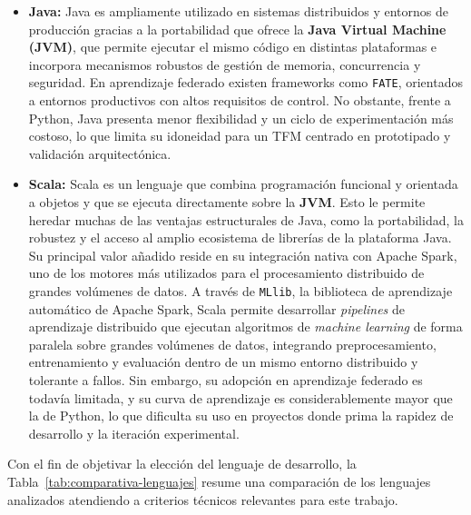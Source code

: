 \documentclass{report}
\begin{document}
\begin{itemize}
\item \textbf{Java:}  
Java es ampliamente utilizado en sistemas distribuidos y entornos de producción gracias a la portabilidad que ofrece la \textbf{Java Virtual Machine (JVM)}, que permite ejecutar el mismo código en distintas plataformas e incorpora mecanismos robustos de gestión de memoria, concurrencia y seguridad.  
En aprendizaje federado existen frameworks como \texttt{FATE}, orientados a entornos productivos con altos requisitos de control. No obstante, frente a Python, Java presenta menor flexibilidad y un ciclo de experimentación más costoso, lo que limita su idoneidad para un TFM centrado en prototipado y validación arquitectónica.


\item \textbf{Scala:}  
Scala es un lenguaje que combina programación funcional y orientada a objetos y que se ejecuta directamente sobre la \textbf{JVM}. Esto le permite heredar muchas de las ventajas estructurales de Java, como la portabilidad, la robustez y el acceso al amplio ecosistema de librerías de la plataforma Java.  
Su principal valor añadido reside en su integración nativa con Apache Spark, uno de los motores más utilizados para el procesamiento distribuido de grandes volúmenes de datos. A través de \texttt{MLlib}, la biblioteca de aprendizaje automático de Apache Spark, Scala permite desarrollar \textit{pipelines} de aprendizaje distribuido que ejecutan algoritmos de \textit{machine learning} de forma paralela sobre grandes volúmenes de datos, integrando preprocesamiento, entrenamiento y evaluación dentro de un mismo entorno distribuido y tolerante a fallos. 
Sin embargo, su adopción en aprendizaje federado es todavía limitada, y su curva de aprendizaje es considerablemente mayor que la de Python, lo que dificulta su uso en proyectos donde prima la rapidez de desarrollo y la iteración experimental.


\end{itemize}

Con el fin de objetivar la elección del lenguaje de desarrollo, la Tabla~\ref{tab:comparativa-lenguajes} resume una comparación de los lenguajes analizados atendiendo a criterios técnicos relevantes para este trabajo.
\end{document}
